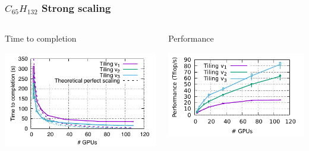 \begin{frame}
  \frametitle{$C_{65}H_{132}$ Strong scaling}

  \begin{columns}
    \begin{column}{.45\linewidth}
      \begin{center}
        Time to completion
        
        \includegraphics[width=\linewidth]{../c65h132-time.pdf}
      \end{center}
    \end{column}
    \begin{column}{.45\linewidth}
      \begin{center}
        Performance
          
          \includegraphics[width=\linewidth]{../c65h132-perf.pdf}
      \end{center}
    \end{column}
  \end{columns}
\end{frame}

